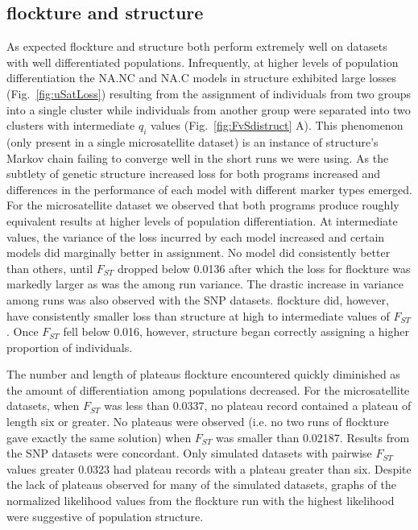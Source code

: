 \subsection*{{\sc flockture} and {\sc structure}} 
As expected {\sc flockture} and {\sc structure} both perform extremely well on datasets with
well differentiated populations. Infrequently, at higher levels of population differentiation the 
NA.NC and NA.C models in {\sc structure} exhibited large losses (Fig.~\ref{fig:uSatLoss})
resulting from the assignment of individuals from two groups into a single cluster while 
individuals from another group were separated into two clusters
with intermediate $q_i$ values (Fig.~\ref{fig:FvSdistruct} A). This phenomenon 
(only present in a single microsatellite dataset) is an instance of {\sc structure}'s
Markov chain failing to converge well in the short runs we were using. As the subtlety of genetic structure 
increased loss for both programs increased and differences in the performance of
each model with different marker types emerged.
For the microsatellite dataset we observed that both programs
produce roughly equivalent results at higher levels of population differentiation. At intermediate 
values, the variance of the loss incurred by each model increased and certain models did marginally
better in assignment. No model did consistently better than others, until $F_{ST}$ dropped 
below 0.0136 after which the loss for {\sc flockture} was markedly larger as was the among run
variance. The drastic increase in variance among runs was also observed with the SNP datasets. 
{\sc flockture} did, however, have consistently smaller loss than  {\sc structure} at high to intermediate 
values of $F_{ST}$. Once $F_{ST}$ fell below 0.016, however, {\sc structure} began correctly assigning a 
higher proportion of individuals. 

The number and length of plateaus {\sc flockture} encountered quickly 
diminished as the amount of differentiation among populations decreased. For the microsatellite datasets,
when $F_{ST}$ was less than 0.0337, no plateau record
contained a plateau of length six or greater. No plateaus were observed 
(i.e. no two runs of {\sc flockture} gave exactly the same solution) when 
$F_{ST}$ was smaller than 0.02187. Results from the SNP datasets
were concordant.
Only simulated datasets with pairwise $F_{ST}$ values greater 0.0323 had plateau records with a 
plateau greater than six. Despite the lack of plateaus observed for many of the simulated datasets, 
graphs of the normalized likelihood values from the {\sc flockture} run with the highest 
likelihood were suggestive of population structure.  

